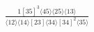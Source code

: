 \documentclass[varwidth, border=5pt]{standalone}
\begin{document}
\begin{my}
$\begin{gathered}
\scriptscriptstyle\frac{1[35]^3⟨45⟩⟨25⟩⟨13⟩}{⟨12⟩⟨14⟩[23]⟨34⟩[34]^2⟨35⟩}
\end{gathered}$
\end{my}
\end{document}
